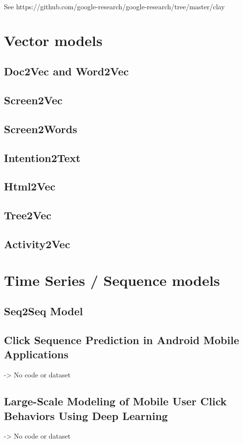 See \cite{clay}
https://github.com/google-research/google-research/tree/master/clay


\section{Vector models}

\subsection{Doc2Vec and Word2Vec}

\subsection{Screen2Vec}

\subsection{Screen2Words}

\subsection{Intention2Text}

\subsection{Html2Vec}

\subsection{Tree2Vec}

\subsection{Activity2Vec}

\section{Time Series / Sequence models}
\subsection{Seq2Seq Model}

\subsection{Click Sequence Prediction in Android Mobile Applications}
\cite{lee2018click}
-> No code or dataset

\subsection{Large-Scale Modeling of Mobile User Click Behaviors Using Deep Learning}
\cite{zhou2021large}
-> No code or dataset

